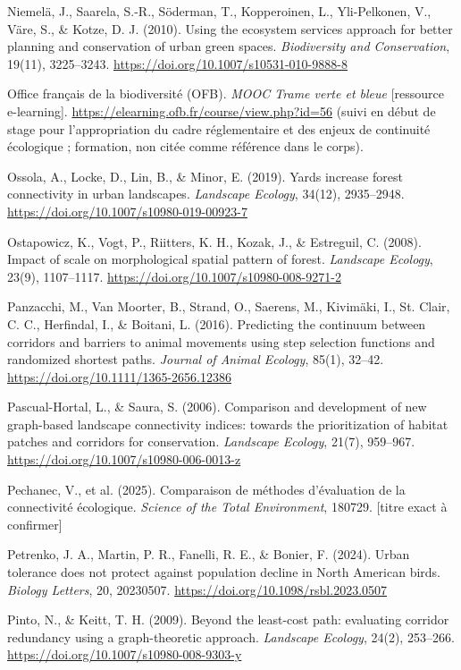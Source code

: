 \documentclass[a4paper,11pt]{report}
\begin{document}
Niemelä, J., Saarela, S.-R., Söderman, T., Kopperoinen, L., Yli-Pelkonen, V., Väre, S., \& Kotze, D. J. (2010). Using the ecosystem services approach for better planning and conservation of urban green spaces. \textit{Biodiversity and Conservation}, 19(11), 3225--3243. \url{https://doi.org/10.1007/s10531-010-9888-8}

Office français de la biodiversité (OFB). \textit{MOOC Trame verte et bleue} [ressource e-learning]. \url{https://elearning.ofb.fr/course/view.php?id=56} (suivi en début de stage pour l'appropriation du cadre réglementaire et des enjeux de continuité écologique ; formation, non citée comme référence dans le corps).

Ossola, A., Locke, D., Lin, B., \& Minor, E. (2019). Yards increase forest connectivity in urban landscapes. \textit{Landscape Ecology}, 34(12), 2935--2948. \url{https://doi.org/10.1007/s10980-019-00923-7}

Ostapowicz, K., Vogt, P., Riitters, K. H., Kozak, J., \& Estreguil, C. (2008). Impact of scale on morphological spatial pattern of forest. \textit{Landscape Ecology}, 23(9), 1107--1117. \url{https://doi.org/10.1007/s10980-008-9271-2}

Panzacchi, M., Van Moorter, B., Strand, O., Saerens, M., Kivimäki, I., St. Clair, C. C., Herfindal, I., \& Boitani, L. (2016). Predicting the continuum between corridors and barriers to animal movements using step selection functions and randomized shortest paths. \textit{Journal of Animal Ecology}, 85(1), 32--42. \url{https://doi.org/10.1111/1365-2656.12386}

Pascual-Hortal, L., \& Saura, S. (2006). Comparison and development of new graph-based landscape connectivity indices: towards the prioritization of habitat patches and corridors for conservation. \textit{Landscape Ecology}, 21(7), 959--967. \url{https://doi.org/10.1007/s10980-006-0013-z}

Pechanec, V., et al. (2025). Comparaison de méthodes d'évaluation de la connectivité écologique. \textit{Science of the Total Environment}, 180729. [titre exact à confirmer]

Petrenko, J. A., Martin, P. R., Fanelli, R. E., \& Bonier, F. (2024). Urban tolerance does not protect against population decline in North American birds. \textit{Biology Letters}, 20, 20230507. \url{https://doi.org/10.1098/rsbl.2023.0507}

Pinto, N., \& Keitt, T. H. (2009). Beyond the least-cost path: evaluating corridor redundancy using a graph-theoretic approach. \textit{Landscape Ecology}, 24(2), 253--266. \url{https://doi.org/10.1007/s10980-008-9303-y}
\end{document}
